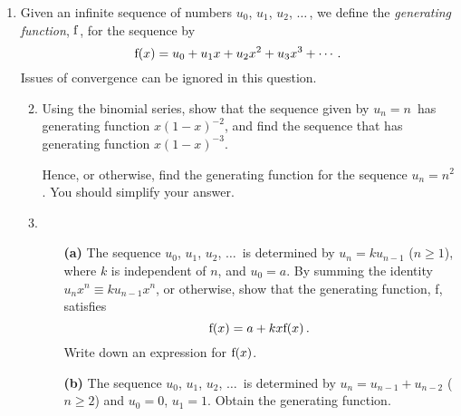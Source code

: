 \documentclass[a4, 11pt]{report}
\newlength{\qspace}
\newcounter{qnumber}
\newenvironment{question}%
 {\vspace{\qspace}
  \begin{enumerate}[\bfseries 1\quad][10]%
    \setcounter{enumi}{\value{qnumber}}%
    \item%
 }
{
  \end{enumerate}
  \filbreak
  \stepcounter{qnumber}
 }
\newenvironment{questionparts}[1][1]%
 {
  \begin{enumerate}[\bfseries (i)]%
    \setcounter{enumii}{#1}
    \addtocounter{enumii}{-1}
    \setlength{\itemsep}{5mm}
    \setlength{\parskip}{8pt}
 }
 {
  \end{enumerate}
 }
\def\f{{\rm f}}
\def\ge{\geqslant}
\begin{document}
\begin{question}
Given an infinite sequence  of numbers
$u_0$, $u_1$, $u_2$, $\ldots\,$, we define the
{\em generating function}, $\f$, for the sequence by
\[
\f(x) =  u_0 + u_1x +u_2 x^2 +u_3 x^3 + \cdots \,.
\]
Issues of convergence can be ignored in this question.

\begin{questionparts}

\item 
Using the binomial series, show that 
the sequence given by $u_n=n\,$ has generating function
$x(1-x)^{-2}$,
and
find the sequence that has generating function $x(1-x)^{-3}$. 

Hence, or otherwise, find the generating function for the 
sequence $u_n =n^2$. You should simplify your answer.

\item 
\begin{itemize}
\item[\bf (a)]
The sequence $u_0$, $u_1$, $u_2$, $\ldots\,$ is 
 determined by
$u_{n} = ku_{n-1}$ ($n\ge1$),
where $k$ is independent of $n$,
and $u_0=a$. 
By summing 
the identity $u_{n}x^n \equiv ku_{n-1}x^n$, or otherwise,
show that
 the generating function, f, satisfies
\[
\f(x) = a + kx \f(x)
\,.
\]
Write down  an expression for $\f(x)$.

\vspace{3mm}
\item[\bf (b)]
The sequence 
 $u_0$, $u_1$, $u_2$, $\ldots\,$ is 
 determined by
$u_{n} = u_{n-1}+ u_{n-2}$ ($n\ge2$)
and $u_0=0$, $u_1=1$. 
Obtain the generating function.

\end{itemize}
\end{questionparts}

\end{question}



\newpage
\end{document}
